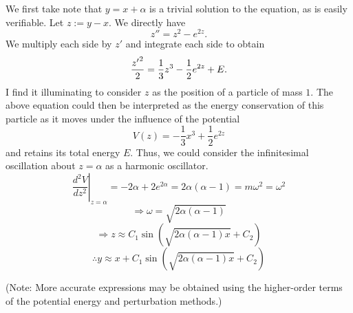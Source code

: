 \item
We first take note that $y = x + \alpha$ is a trivial solution to the equation, as is easily verifiable.
Let $z := y - x$.
We directly have
\[
	z'' = z^2 - e^{2z}.
\]
We multiply each side by $z'$ and integrate each side to obtain
\[
	\frac{{z'}^2}{2} = \frac{1}{3}z^3 - \frac{1}{2} e^{2z} + E.
\]
I find it illuminating to consider $z$ as the position of a particle of mass $1$.
The above equation could then be interpreted as the energy conservation of this particle as it moves under the influence of the potential
\[
	V(z) = -\frac{1}{3}x^3 + \frac{1}{2}e^{2z}
\]
and retains its total energy $E$.
Thus, we could consider the infinitesimal oscillation about $z=\alpha$ as a harmonic oscillator.
\[
	\left. \frac{d^2 V}{dz^2} \right|_{z = \alpha}
	= -2\alpha + 2e^{2\alpha} = 2\alpha (\alpha - 1)
	= m\omega^2 = \omega^2
\]
\[
	\Rightarrow \omega = \sqrt{2\alpha(\alpha - 1)}
\]
\[
	\Rightarrow z \approx C_1 \sin \left(
		\sqrt{2\alpha (\alpha - 1) x} + C_2
	\right)
\]
\[
	\therefore y \approx x + C_1 \sin \left(
		\sqrt{2\alpha (\alpha - 1) x} + C_2
	\right)
\]

(Note: More accurate expressions may be obtained using the higher-order terms of the potential energy and perturbation methods.)